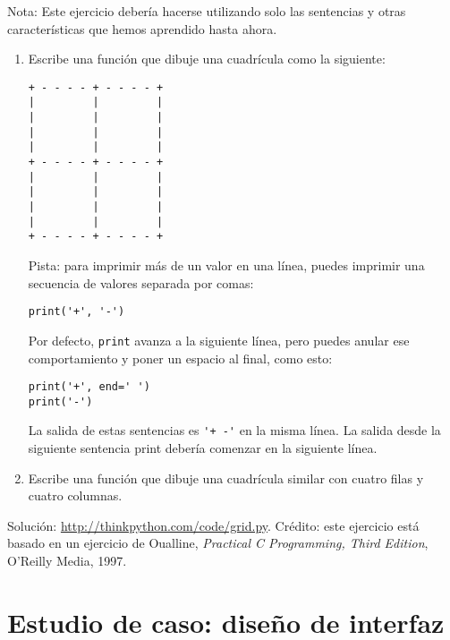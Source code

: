 \documentclass[10pt]{book}
\begin{document}
\begin{exercise}

Nota: Este ejercicio debería hacerse
utilizando solo las sentencias y otras características que hemos aprendido hasta
ahora.

\begin{enumerate}

\item Escribe una función que dibuje una cuadrícula como la siguiente:
\newpage
\begin{verbatim}
+ - - - - + - - - - +
|         |         |
|         |         |
|         |         |
|         |         |
+ - - - - + - - - - +
|         |         |
|         |         |
|         |         |
|         |         |
+ - - - - + - - - - +
\end{verbatim}
%
Pista: para imprimir más de un valor en una línea, puedes imprimir
una secuencia de valores separada por comas:

\begin{verbatim}
print('+', '-')
\end{verbatim}
%
Por defecto, {\tt print} avanza a la siguiente línea, pero
puedes anular ese comportamiento y poner un espacio al final, como esto:

\begin{verbatim}
print('+', end=' ')
print('-')
\end{verbatim}
%
La salida de estas sentencias es \verb"'+ -'" en la misma línea.
La salida desde la siguiente sentencia print debería comenzar en la siguiente línea.

\item Escribe una función que dibuje una cuadrícula similar
con cuatro filas y cuatro columnas.

\end{enumerate}

Solución: \url{http://thinkpython.com/code/grid.py}.
Crédito: este ejercicio está basado en un ejercicio de Oualline, {\em
    Practical C Programming, Third Edition}, O'Reilly Media, 1997.

\end{exercise}





\chapter{Estudio de caso: diseño de interfaz}
\label{turtlechap}
\end{document}
